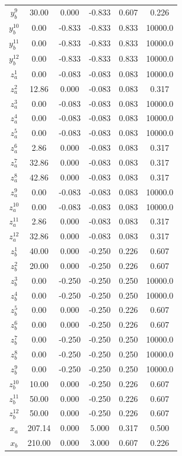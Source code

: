 \documentclass[a4paper,11pt]{article}
\begin{document}
\begin{longtable}{cccccc}
\addlinespace
$y_b^{9}$ & 30.00 & 0.000 & -0.833 & 0.607 & 0.226\\
$y_b^{10}$ & 0.00 & -0.833 & -0.833 & 0.833 & 10000.0\\
$y_b^{11}$ & 0.00 & -0.833 & -0.833 & 0.833 & 10000.0\\
$y_b^{12}$ & 0.00 & -0.833 & -0.833 & 0.833 & 10000.0\\
$z_a^{1}$ & 0.00 & -0.083 & -0.083 & 0.083 & 10000.0\\
\addlinespace
$z_a^{2}$ & 12.86 & 0.000 & -0.083 & 0.083 & 0.317\\
$z_a^{3}$ & 0.00 & -0.083 & -0.083 & 0.083 & 10000.0\\
$z_a^{4}$ & 0.00 & -0.083 & -0.083 & 0.083 & 10000.0\\
$z_a^{5}$ & 0.00 & -0.083 & -0.083 & 0.083 & 10000.0\\
$z_a^{6}$ & 2.86 & 0.000 & -0.083 & 0.083 & 0.317\\
\addlinespace
$z_a^{7}$ & 32.86 & 0.000 & -0.083 & 0.083 & 0.317\\
$z_a^{8}$ & 42.86 & 0.000 & -0.083 & 0.083 & 0.317\\
$z_a^{9}$ & 0.00 & -0.083 & -0.083 & 0.083 & 10000.0\\
$z_a^{10}$ & 0.00 & -0.083 & -0.083 & 0.083 & 10000.0\\
$z_a^{11}$ & 2.86 & 0.000 & -0.083 & 0.083 & 0.317\\
\addlinespace
$z_a^{12}$ & 32.86 & 0.000 & -0.083 & 0.083 & 0.317\\
$z_b^{1}$ & 40.00 & 0.000 & -0.250 & 0.226 & 0.607\\
$z_b^{2}$ & 20.00 & 0.000 & -0.250 & 0.226 & 0.607\\
$z_b^{3}$ & 0.00 & -0.250 & -0.250 & 0.250 & 10000.0\\
$z_b^{4}$ & 0.00 & -0.250 & -0.250 & 0.250 & 10000.0\\
\addlinespace
$z_b^{5}$ & 0.00 & 0.000 & -0.250 & 0.226 & 0.607\\
$z_b^{6}$ & 0.00 & 0.000 & -0.250 & 0.226 & 0.607\\
$z_b^{7}$ & 0.00 & -0.250 & -0.250 & 0.250 & 10000.0\\
$z_b^{8}$ & 0.00 & -0.250 & -0.250 & 0.250 & 10000.0\\
$z_b^{9}$ & 0.00 & -0.250 & -0.250 & 0.250 & 10000.0\\
\addlinespace
$z_b^{10}$ & 10.00 & 0.000 & -0.250 & 0.226 & 0.607\\
$z_b^{11}$ & 50.00 & 0.000 & -0.250 & 0.226 & 0.607\\
$z_b^{12}$ & 50.00 & 0.000 & -0.250 & 0.226 & 0.607\\
$x_a$ & 207.14 & 0.000 & 5.000 & 0.317 & 0.500\\
$x_b$ & 210.00 & 0.000 & 3.000 & 0.607 & 0.226\\*
\end{longtable}
\endgroup{}
\end{document}

